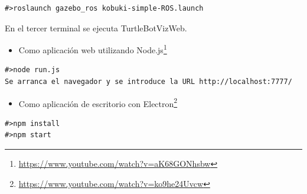 \begin{lstlisting}[caption= Ejecución del driver de ROS label=cod.gazeboturtle]
#>roslaunch gazebo_ros kobuki-simple-ROS.launch
\end{lstlisting}

En el tercer terminal se ejecuta TurtleBotVizWeb.

\begin{itemize}
\item 
Como aplicación web utilizando Node.js\footnote{\url{https://www.youtube.com/watch?v=aK68GONhsbw}}
\end{itemize}
\begin{lstlisting}[caption= Ejecución con Node.js, label=cod.turtlenodejs]
#>node run.js
Se arranca el navegador y se introduce la URL http://localhost:7777/
\end{lstlisting}
\begin{itemize}
\item 
Como aplicación de escritorio con Electron\footnote{\url{https://www.youtube.com/watch?v=ko9he24Uvcw}}
\end{itemize}
\begin{lstlisting}[caption= Ejecución con Electron, label=cod.turtleelectron]
#>npm install
#>npm start
\end{lstlisting}

